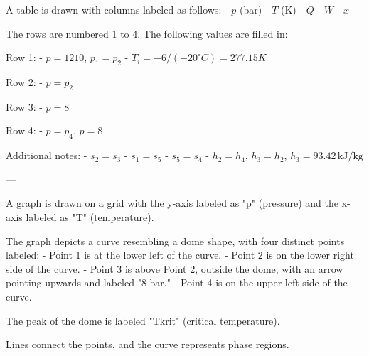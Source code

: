 A table is drawn with columns labeled as follows:  
- \( p \) (bar)  
- \( T \) (K)  
- \( Q \)  
- \( W \)  
- \( x \)  

The rows are numbered 1 to 4. The following values are filled in:  

Row 1:  
- \( p = 1210 \), \( p_1 = p_2 \)  
- \( T_i = -6 / (-20^\circ C) = 277.15K \)  

Row 2:  
- \( p = p_2 \)  

Row 3:  
- \( p = 8 \)  

Row 4:  
- \( p = p_4 \), \( p = 8 \)  

Additional notes:  
- \( s_2 = s_3 \)  
- \( s_1 = s_5 \)  
- \( s_5 = s_4 \)  
- \( h_2 = h_4 \), \( h_3 = h_2 \), \( h_3 = 93.42 \, \text{kJ/kg} \)  

---

A graph is drawn on a grid with the y-axis labeled as "p" (pressure) and the x-axis labeled as "T" (temperature).  

The graph depicts a curve resembling a dome shape, with four distinct points labeled:  
- Point 1 is at the lower left of the curve.  
- Point 2 is on the lower right side of the curve.  
- Point 3 is above Point 2, outside the dome, with an arrow pointing upwards and labeled "8 bar."  
- Point 4 is on the upper left side of the curve.  

The peak of the dome is labeled "Tkrit" (critical temperature).  

Lines connect the points, and the curve represents phase regions.